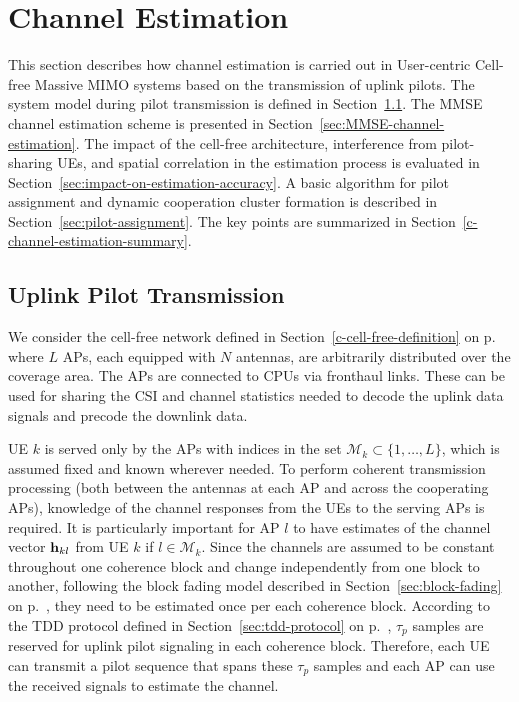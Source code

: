 

\chapter{Channel Estimation}
\label{c-channel-estimation}

This section describes how channel estimation is carried out in User-centric Cell-free Massive \gls{MIMO} systems based on the transmission of uplink pilots. The system model during pilot transmission is defined in Section~\ref{sec:uplink-pilot}. The \gls{MMSE} channel estimation scheme is presented in Section~\ref{sec:MMSE-channel-estimation}.  The impact of the cell-free architecture, interference from pilot-sharing UEs, and spatial correlation in the estimation process is evaluated in Section~\ref{sec:impact-on-estimation-accuracy}. 
A basic algorithm for pilot assignment and dynamic cooperation cluster formation is described in Section~\ref{sec:pilot-assignment}.
The key points are summarized in Section~\ref{c-channel-estimation-summary}.

\enlargethispage{\baselineskip} 

\section{Uplink Pilot Transmission}
\label{sec:uplink-pilot}

We consider the cell-free network defined in Section~\ref{c-cell-free-definition} on p.~\pageref{c-cell-free-definition} where $L$ \glspl{AP}, each equipped with $N$ antennas, are arbitrarily distributed over the coverage area. The \glspl{AP} are connected to CPUs via fronthaul links. These can be used for sharing the \gls{CSI} and channel statistics  needed to decode the uplink data signals and precode the downlink data.

\gls{UE} $k$ is served only by the APs with indices in the set $\mathcal{M}_k \subset \{1,\ldots,L\}$, which is assumed fixed and known wherever needed. 
To perform coherent transmission processing (both between the antennas at each AP and across the cooperating APs), knowledge of the channel responses from the UEs to the serving APs is required. It is particularly important for AP $l$ to have estimates of the channel vector ${\bf h}_{kl}$ from UE $k$ if $l \in \mathcal{M}_k$. Since the channels are assumed to be constant throughout one coherence block and change independently from one block to another, following the block fading model described in Section~\ref{sec:block-fading} on p.~\pageref{sec:block-fading}, they need to be estimated once per each coherence block. According to the TDD protocol defined in Section~\ref{sec:tdd-protocol} on p.~\pageref{sec:tdd-protocol}, $\tau_p$ samples are reserved for uplink pilot signaling in each coherence block. Therefore, each UE can transmit a pilot sequence that spans these $\tau_p$ samples and each AP can use the received signals to estimate the channel.

